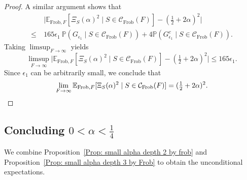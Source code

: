 \documentclass[12pt]{amsart}
\def\E{{\mathbb E}}
\renewcommand{\P}{\mathbb{P}}
\newcommand{\cC}{\mathcal{C}}
\newcommand{\Frob}{\text{Frob}}
\begin{document}
\begin{proof}
A similar argument shows that
\begin{align*}
&\ \Big|\E_{\Frob,F}[\Xi_S(\alpha)^2\mid S\in\cC_{\Frob}(F)]-(\tfrac{1}{2}+2\alpha)^2\Big|\\
\leq &\ 165\epsilon_1\ \P(G_{\epsilon_1}\mid S\in\cC_{\Frob}(F))
+4\P(G_{\epsilon_1}^c\mid S\in \cC_{\Frob}(F)).
\end{align*}
Taking $\limsup_{F\to\infty}$ yields
\[
\limsup_{F\to\infty}\Big|\E_{\Frob,F}[\Xi_S(\alpha)^2\mid S\in\cC_{\Frob}(F)]-(\tfrac{1}{2}+2\alpha)^2\Big|
\leq 165\epsilon_1.\]
Since $\epsilon_1$ can be arbitrarily small, we conclude that
\[
\lim_{F\to\infty}\E_{\Frob,F}[\Xi_S(\alpha)^2\mid S\in\cC_{\Frob}(F)]=(\tfrac{1}{2}+2\alpha)^2.\qedhere
\]
\end{proof}




\subsection{Concluding $0<\alpha<\frac{1}{4}$}

We combine Proposition~\ref{Prop: small alpha depth 2 by frob} and Proposition~\ref{Prop: small alpha depth 3 by Frob} to obtain the unconditional expectations.
\end{document}
